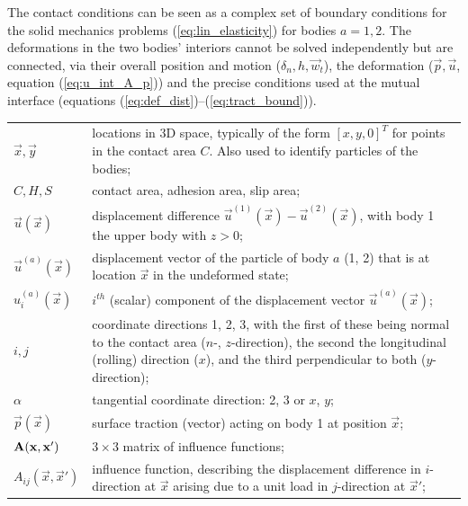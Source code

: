 \documentclass[12pt]{report}
\begin{document}
The contact conditions can be seen as a complex set of boundary conditions
for the solid mechanics problems (\ref{eq:lin_elasticity}) for bodies $a=1,2$.
The deformations in the two bodies' interiors cannot be solved independently
but are connected, via their overall position and motion ($\delta_n, h, 
\vec{w}_t$), the deformation ($\vec{p}, \vec{u}$, equation 
(\ref{eq:u_int_A_p})) and the precise conditions used at the mutual interface
(equations (\ref{eq:def_dist})--(\ref{eq:tract_bound})).

\begin{table}[p]
\begin{tabular}{lp{140mm}}
$\vec{x}, \vec{y}$ & locations in 3D space, typically of the form
                $[x,y,0]^T$ for points in the contact area
                $C$. Also used to identify particles of the bodies; \\[0.5ex]
$C, H, S$     & contact area, adhesion area, slip area;\\[0.5ex]
$\vec{u}(\vec{x})$ & displacement difference $\vec{u}^{(1)}(\vec{x})
                -\vec{u}^{(2)}(\vec{x})$, with body 1 the upper body with
                $z>0$; \\[0.5ex]
$\vec{u}^{(a)}(\vec{x})$ & displacement vector of the particle of body
                $a$ (1, 2) that is at location $\vec{x}$ in the undeformed
                state; \\[0.5ex]
$u_i^{(a)}(\vec{x})$ & $i^{th}$ (scalar) component of the displacement
                vector $\vec{u}^{(a)}(\vec{x})$; \\[0.5ex]
$i, j$        & coordinate directions 1, 2, 3, with the first of these being
                normal to the contact area ($n$-, $z$-direction), the second
                the longitudinal (rolling) direction ($x$), and the third
                perpendicular to both ($y$-direction); \\[0.5ex]
$\alpha$      & tangential coordinate direction: 2, 3 or $x$, $y$; \\[0.5ex]
$\vec{p}(\vec{x})$ & surface traction (vector) acting on body 1 at position
                $\vec{x}$; \\[0.5ex]
$\mathbf{A}(\mathbf{x},\mathbf{x}')$ & $3\times 3$ matrix of influence functions;
                \\[0.5ex]
$A_{ij}(\vec{x},\vec{x}')$ & influence function, describing the displacement
                difference in $i$-direction at $\vec{x}$ arising due to a unit
                load in $j$-direction at $\vec{x}'$; \\[0.5ex]

\end{tabular}
\end{table}
\end{document}
